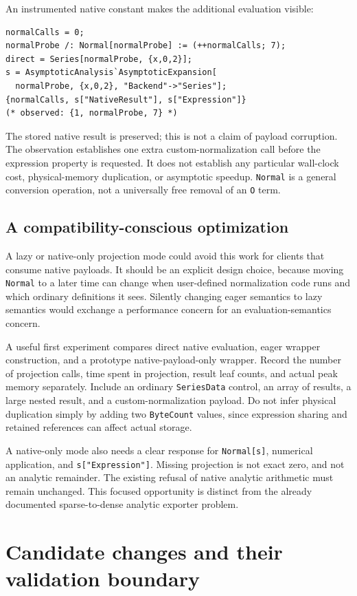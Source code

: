\documentclass[11pt,letterpaper]{article}
\newcommand{\code}[1]{\nolinkurl{#1}}
\begin{document}
An instrumented native constant makes the additional evaluation visible:
\begin{lstlisting}
normalCalls = 0;
normalProbe /: Normal[normalProbe] := (++normalCalls; 7);
direct = Series[normalProbe, {x,0,2}];
s = AsymptoticAnalysis`AsymptoticExpansion[
  normalProbe, {x,0,2}, "Backend"->"Series"];
{normalCalls, s["NativeResult"], s["Expression"]}
(* observed: {1, normalProbe, 7} *)
\end{lstlisting}
The stored native result is preserved; this is not a claim of payload
corruption. The observation establishes one extra custom-normalization call
before the expression property is requested. It does not establish any
particular wall-clock cost, physical-memory duplication, or asymptotic speedup.
\code{Normal} is a general conversion operation, not a universally free removal
of an \code{O} term.~\cite{wl-normal}

\subsection{A compatibility-conscious optimization}
A lazy or native-only projection mode could avoid this work for clients that
consume native payloads. It should be an explicit design choice, because
moving \code{Normal} to a later time can change when user-defined normalization
code runs and which ordinary definitions it sees. Silently changing eager
semantics to lazy semantics would exchange a performance concern for an
evaluation-semantics concern.

A useful first experiment compares direct native evaluation, eager wrapper
construction, and a prototype native-payload-only wrapper. Record the number
of projection calls, time spent in projection, result leaf counts, and actual
peak memory separately. Include an ordinary \code{SeriesData} control, an array
of results, a large nested result, and a custom-normalization payload. Do not
infer physical duplication simply by adding two \code{ByteCount} values, since
expression sharing and retained references can affect actual storage.

A native-only mode also needs a clear response for \code{Normal[s]}, numerical
application, and \code{s["Expression"]}. Missing projection is not exact zero,
and not an analytic remainder. The existing refusal of native analytic
arithmetic must remain unchanged. This focused opportunity is distinct from
the already documented sparse-to-dense analytic exporter problem.

\section{Candidate changes and their validation boundary}\label{sec:patch}
\end{document}
